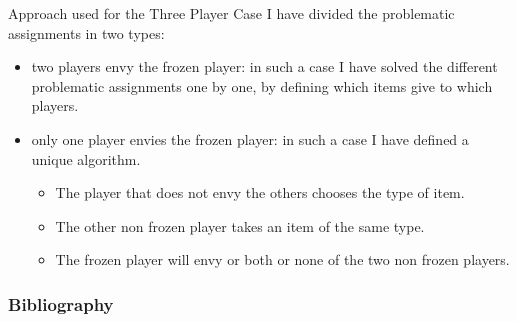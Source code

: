 \begin{frame}{Approach used for the Three Player Case}
    I have divided the problematic assignments in two types:
    \begin{itemize}
        \item two players envy the frozen player: in such a case I have solved the different problematic assignments one by one, by defining which items give to which players.
        \item only one player envies the frozen player: in such a case I have defined a unique algorithm.
        \begin{itemize}
            \item The player that does not envy the others chooses the type of item.
            \item The other non frozen player takes an item of the same type.
            \item The frozen player will envy or both or none of the two non frozen players.
        \end{itemize}
    \end{itemize}
\end{frame}

\begin{frame}[allowframebreaks]
\frametitle{Bibliography}
\printbibliography

\end{frame}